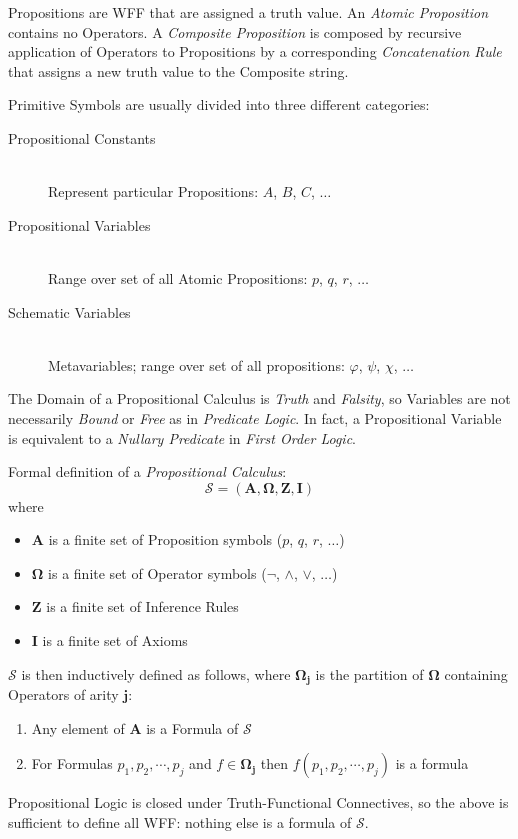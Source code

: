 \documentclass{article}
\begin{document}
Propositions are WFF that are assigned a truth value. An \emph{Atomic
  Proposition} contains no Operators. A \emph{Composite Proposition}
is composed by recursive application of Operators to Propositions by a
corresponding \emph{Concatenation Rule} that assigns a new truth value
to the Composite string.

Primitive Symbols are usually divided into three different categories:
\begin{description}
\item[Propositional Constants] \hfill \\
Represent particular Propositions: $A$, $B$, $C$, $\ldots$
\item[Propositional Variables] \hfill \\
Range over set of all Atomic Propositions: $p$, $q$, $r$, $\ldots$
\item[Schematic Variables] \hfill \\
Metavariables; range over set of all propositions: $\varphi$, $\psi$,
$\chi$, $\ldots$
\end{description}

The Domain of a Propositional Calculus is \emph{Truth} and
\emph{Falsity}, so Variables are not necessarily \emph{Bound} or
\emph{Free} as in \emph{Predicate Logic}. In fact, a Propositional
Variable is equivalent to a \emph{Nullary Predicate} in \emph{First
  Order Logic}.

Formal definition of a \emph{Propositional Calculus}:
\[
    \mathcal{S} = (\mathbf{A},\mathbf{\Omega},\mathbf{Z},\mathbf{I})
\]
where
\begin{itemize}
\item $\mathbf{A}$ is a finite set of Proposition symbols ($p$, $q$,
  $r$, $\ldots$)
\item $\mathbf{\Omega}$ is a finite set of Operator symbols ($\neg$,
  $\wedge$, $\vee$, $\ldots$)
\item $\mathbf{Z}$ is a finite set of Inference Rules
\item $\mathbf{I}$ is a finite set of Axioms
\end{itemize}
$\mathcal{S}$ is then inductively defined as follows, where
$\mathbf{\Omega_j}$ is the partition of $\mathbf{\Omega}$ containing
Operators of arity $\mathbf{j}$:
\begin{enumerate}
\item Any element of $\mathbf{A}$ is a Formula of $\mathcal{S}$
\item For Formulas $p_1, p_2, \cdots, p_j$ and $f \in
  \mathbf{\Omega_j}$ then $f(p_1, p_2, \cdots, p_j)$ is a formula
\end{enumerate}
Propositional Logic is closed under Truth-Functional Connectives, so
the above is sufficient to define all WFF: nothing else is a formula
of $\mathcal{S}$.
\end{document}
